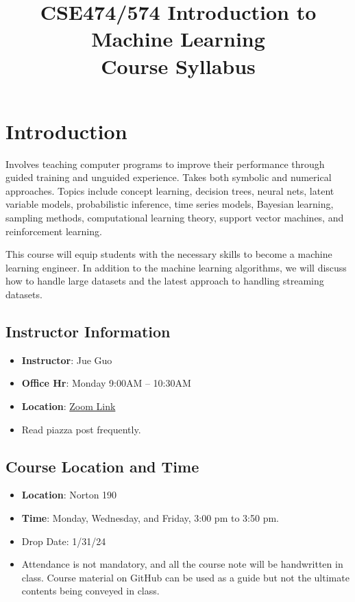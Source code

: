 \documentclass{article}
\title{CSE474/574 Introduction to Machine Learning \\ \vspace{0.5cm} \large Course Syllabus}
\author{}
\date{}
\begin{document}
\maketitle

\section{Introduction}
Involves teaching computer programs to improve their performance through guided training and unguided experience. Takes both symbolic and numerical approaches. Topics include concept learning, decision trees, neural nets, latent variable models, probabilistic inference, time series models, Bayesian learning, sampling methods, computational learning theory, support vector machines, and reinforcement learning.

This course will equip students with the necessary skills to become a machine learning engineer. In addition to the machine learning algorithms, we will discuss how to handle large datasets and the latest approach to handling streaming datasets.
\subsection{Instructor Information}
\begin{itemize}
    \item \textbf{Instructor}: Jue Guo
    \item \textbf{Office Hr}: Monday 9:00AM -- 10:30AM
    \item \textbf{Location}: \href{https://buffalo.zoom.us/j/7673733717?pwd=TktTVXlDOGgxM3dRUC9UT21hNEdOQT09&omn=92002344719}{Zoom Link}
    \item Read piazza post frequently.
\end{itemize}
\subsection{Course Location and Time}
\begin{itemize}
    \item \textbf{Location}: Norton 190
    \item \textbf{Time}: Monday, Wednesday, and Friday, 3:00 pm to 3:50 pm.
    \item Drop Date: 1/31/24
    \item Attendance is not mandatory, and all the course note will be handwritten in class. Course material on GitHub can be used as a guide but not the ultimate contents being conveyed in class.
\end{itemize}
\end{document}
